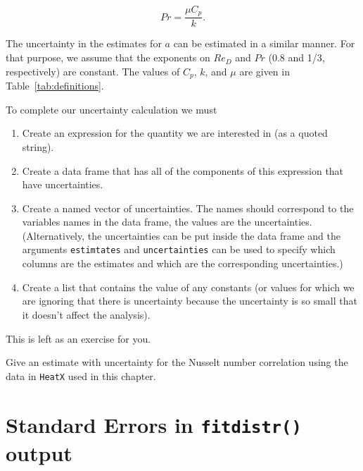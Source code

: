 \documentclass[twoside]{book}\usepackage[]{graphicx}\usepackage[]{xcolor}
\newcommand{\Rindex}[1]{\index{\texttt{#1}}}
\newcommand{\dataframe}[1]{{\color{blue!80!black}\texttt{#1}}\Rindex{#1}}
\newcommand{\option}[1]{{\color{brown!80!black}\texttt{#1}}}
\begin{document}
\begin{equation}
    Pr = \frac{\mu C_{p}}{k}.
\end{equation}

The uncertainty in the estimates for $a$ can be estimated in a similar manner.
For that purpose, we assume that the exponents on $Re_{D}$ and $Pr$
(0.8 and 1/3, respectively)
are constant.
The values of $C_{p}$, $k$, and $\mu$ are given in Table~\ref{tab:definitions}.

To complete our uncertainty calculation we must
\begin{enumerate}
	\item
		Create an expression for the quantity we are interested in (as a quoted string).
	\item
		Create a data frame that has all of the components of this expression
		that have uncertainties.
	\item
		Create a named vector of uncertainties.  The names should correspond 
		to the variables names in the data frame, the values are the uncertainties.
		(Alternatively, the uncertainties can be put inside the data frame and 
		the arguments \option{estimtates} and \option{uncertainties} can be 
		used to specify which columns are the estimates and which are the
		corresponding uncertainties.)
	\item
		Create a list that contains the value of any constants (or values for which
		we are ignoring that there is uncertainty because the uncertainty is so 
		small that it doesn't affect the analysis).
\end{enumerate}

This is left as an exercise for you.

\begin{problem}
	Give an estimate with uncertainty for the
	Nusselt number correlation using the data in \dataframe{HeatX} used
	in this chapter.
\end{problem}

\section{Standard Errors in \texttt{fitdistr()} output}
\end{document}
